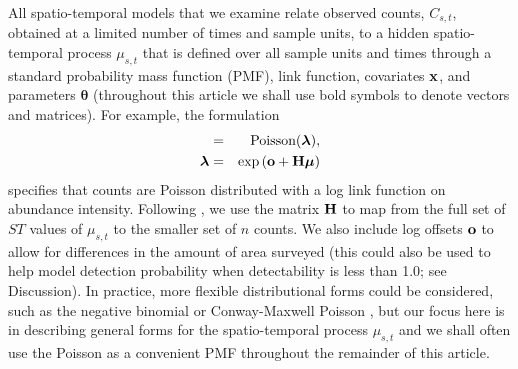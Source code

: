 \documentclass[12pt,english]{article}
\begin{document}
\begin{spacing}{1.9}
All spatio-temporal models that we examine relate observed counts, $C_{s,t}$, obtained at a limited number of times and sample units, to a hidden spatio-temporal process $\mu_{s,t}$ that is defined over all sample units and times through a standard probability mass function (PMF), link function, covariates ${\bf x}$, and parameters $\boldsymbol{\theta}$ (throughout this article we shall use bold symbols to denote vectors and matrices).  For example, the formulation
\begin{eqnarray}
  [\bf C] & = & \textrm{Poisson}(\boldsymbol{\lambda}), \nonumber \\
  \boldsymbol{\lambda} & = & \exp \left( {\bf o} + {\bf H}\boldsymbol{\mu} \right)
  \label{eq:basic-mod}
\end{eqnarray}
specifies that counts are Poisson distributed with a log link function on abundance intensity. Following \citet{WikleHooten2010}, we use the matrix ${\bf H}$ to map from the full set of $ST$ values of $\mu_{s,t}$ to the smaller set of $n$ counts. We also include log offsets ${\bf o}$ to allow for differences in the amount of area surveyed (this could also be used to help model detection probability when detectability is less than 1.0; see Discussion).  In practice, more flexible distributional forms could be considered, such as the negative binomial or Conway-Maxwell Poisson \citep{WuEtAl2013}, but our focus here is in describing general forms for the spatio-temporal process $\mu_{s,t}$ and we shall often use the Poisson as a convenient PMF throughout the remainder of this article.


\end{spacing}
\end{document}
